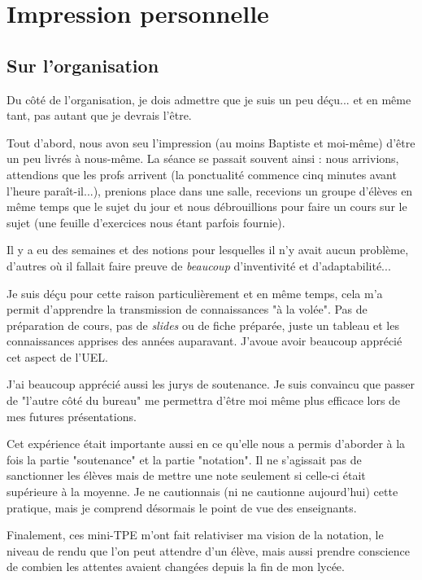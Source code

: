 \section{Impression personnelle}

\subsection{Sur l'organisation}

Du côté de l'organisation, je dois admettre que je suis un peu déçu... et en même tant, pas autant que je devrais
l'être.

Tout d'abord, nous avon seu l'impression (au moins Baptiste et moi-même) d'être un peu livrés à nous-même. La séance se
passait souvent ainsi : nous arrivions, attendions que les profs arrivent (la ponctualité commence cinq minutes avant
l'heure paraît-il...), prenions place dans une salle, recevions un groupe d'élèves en même temps que le sujet du jour et
nous débrouillions pour faire un cours sur le sujet (une feuille d'exercices nous étant parfois fournie).

Il y a eu des semaines et des notions pour lesquelles il n'y avait aucun problème, d'autres où il fallait faire preuve
de \textit{beaucoup} d'inventivité et d'adaptabilité...

Je suis déçu pour cette raison particulièrement et en même temps, cela m'a permit d'apprendre la transmission de
connaissances "à la volée". Pas de préparation de cours, pas de \textit{slides} ou de fiche préparée, juste un tableau
et les connaissances apprises des années auparavant. J'avoue avoir beaucoup apprécié cet aspect de l'UEL.

J'ai beaucoup apprécié aussi les jurys de soutenance. Je suis convaincu que passer de "l'autre côté du bureau" me
permettra d'être moi même plus efficace lors de mes futures présentations.

Cet expérience était importante aussi en ce qu'elle nous a permis d'aborder à la fois la partie "soutenance" et la
partie "notation". Il ne s'agissait pas de sanctionner les élèves mais de mettre une note seulement si celle-ci était
supérieure à la moyenne. Je ne cautionnais (ni ne cautionne aujourd'hui) cette pratique, mais je comprend désormais le
point de vue des enseignants.

Finalement, ces mini-TPE m'ont fait relativiser ma vision de la notation, le niveau de rendu que l'on peut attendre d'un
élève, mais aussi prendre conscience de combien les attentes avaient changées depuis la fin de mon lycée.

